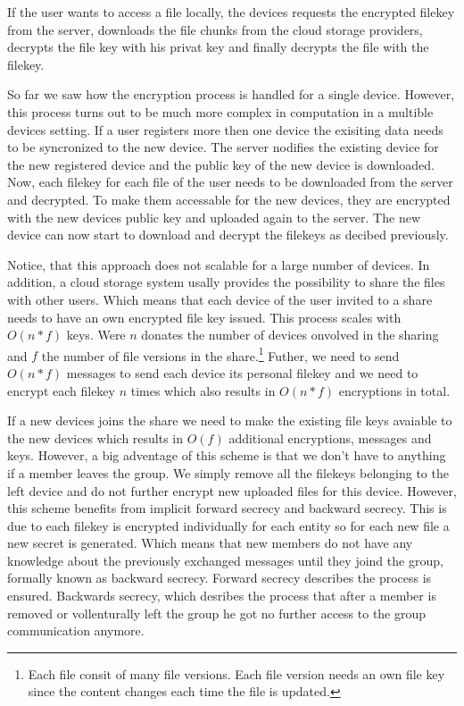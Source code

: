 If the user wants to access a file locally, the devices requests the encrypted filekey from the server, downloads the file chunks from the cloud storage providers, decrypts the file key with his privat key and finally decrypts the file with the filekey. 

So far we saw how the encryption process is handled for a single device. However, this process turns out to be much more complex in computation in a multible devices setting.  If a user registers more then one device the exisiting data needs to be syncronized to the new device. The server nodifies the existing device for the new registered device and the public key of the new device is downloaded. Now, each filekey for each file of the user needs to be downloaded from the server and decrypted. To make them accessable for the new devices, they are encrypted with the new devices public key and uploaded again to the server. The new device can now start to download and decrypt the filekeys as decibed previously. 

Notice, that this approach does not scalable for a large number of devices. In addition, a cloud storage system usally provides the possibility to share the files with other users. Which means that each device of the user invited to a share needs to have an own encrypted file key issued. This process scales with $O(n * f)$ keys. Were $n$ donates the number of devices onvolved in the sharing and $f$ the number of file versions in the share.\footnote{Each file consit of many file versions. Each file version needs an own file key since the content changes each time the file is updated.} Futher, we need to send $O(n * f)$ messages to send each device its personal filekey and we need to encrypt each filekey $n$ times which also results in $O(n * f)$ encryptions in total. 

If a new devices joins the share we need to make the existing file keys avaiable to the new devices which results in $O(f)$ additional encryptions, messages and keys. However, a big adventage of this scheme is that we don't have to anything if a member leaves the group. We simply remove all the filekeys belonging to the left device and do not further encrypt new uploaded files for this device. However, this scheme benefits from implicit forward secrecy and backward secrecy. This is due to each filekey is encrypted individually for each entity so for each new file a new secret is generated. Which means that new members do not have any knowledge about the previously exchanged messages until they joind the group, formally known as backward secrecy. Forward secrecy describes the process is ensured. Backwards secrecy, which desribes the process that after a member is removed or vollenturally left the group he got no further access to the group communication anymore.

